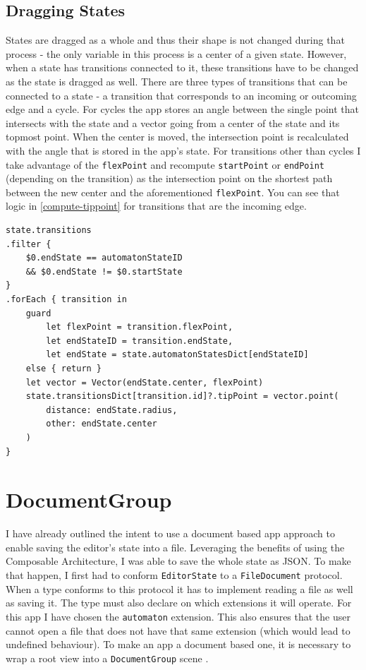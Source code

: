 \subsection{Dragging States}

States are dragged as a whole and thus their shape is not changed during that process - the only variable in this process is a center of a given state. However, when a state has transitions connected to it, these transitions have to be changed as the state is dragged as well. There are three types of transitions that can be connected to a state - a transition that corresponds to an incoming or outcoming edge and a cycle. For cycles the app stores an angle between the single point that intersects with the state and a vector going from a center of the state and its topmost point. When the center is moved, the intersection point is recalculated with the angle that is stored in the app's state. For transitions other than cycles I take advantage of the \lstinline{flexPoint} and recompute \lstinline{startPoint} or \lstinline{endPoint} (depending on the transition) as the intersection point on the shortest path between the new center and the aforementioned \lstinline{flexPoint}. You can see that logic in \ref{compute-tippoint} for transitions that are the incoming edge.

\begin{lstlisting}[caption={Calculation of new \lstinline{tipPoint}}, label=compute-tippoint]
state.transitions
.filter { 
    $0.endState == automatonStateID 
    && $0.endState != $0.startState 
}
.forEach { transition in
    guard
        let flexPoint = transition.flexPoint,
        let endStateID = transition.endState,
        let endState = state.automatonStatesDict[endStateID]
    else { return }
    let vector = Vector(endState.center, flexPoint)
    state.transitionsDict[transition.id]?.tipPoint = vector.point(
        distance: endState.radius, 
        other: endState.center
    )
}
\end{lstlisting}
 
\section{DocumentGroup}

I have already outlined the intent to use a document based app approach to enable saving the editor's state into a file. Leveraging the benefits of using the Composable Architecture, I was able to save the whole state as JSON. To make that happen, I first had to conform \lstinline{EditorState} to a \lstinline{FileDocument} protocol. When a type conforms to this protocol it has to implement reading a file as well as saving it. The type must also declare on which extensions it will operate. For this app I have chosen the \lstinline{automaton} extension. This also ensures that the user cannot open a file that does not have that same extension (which would lead to undefined behaviour). To make an app a document based one, it is necessary to wrap a root view into a \lstinline{DocumentGroup} scene \cite{documentgroup}. 

